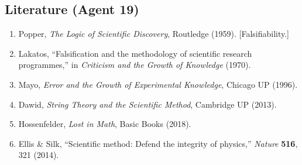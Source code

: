 \documentclass[11pt,a4paper]{article}
\begin{document}
\subsection{Literature (Agent 19)}

\begin{enumerate}
\item Popper, \textit{The Logic of Scientific Discovery}, Routledge (1959). [Falsifiability.]
\item Lakatos, ``Falsification and the methodology of scientific research programmes,'' in \textit{Criticism and the Growth of Knowledge} (1970).
\item Mayo, \textit{Error and the Growth of Experimental Knowledge}, Chicago UP (1996).
\item Dawid, \textit{String Theory and the Scientific Method}, Cambridge UP (2013).
\item Hossenfelder, \textit{Lost in Math}, Basic Books (2018).
\item Ellis \& Silk, ``Scientific method: Defend the integrity of physics,'' \textit{Nature} \textbf{516}, 321 (2014).
\end{enumerate}
\end{document}
